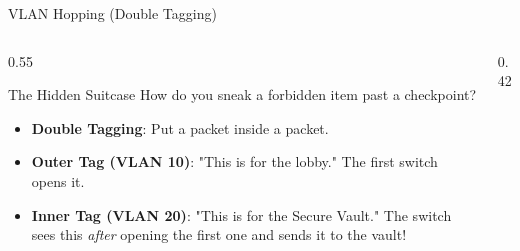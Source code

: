 \documentclass[aspectratio=169]{beamer}  %
\begin{document}
\begin{frame}{VLAN Hopping (Double Tagging)}
    \begin{columns}[T]
        \begin{column}{0.55\textwidth}
            \begin{block}{The Hidden Suitcase}
                \footnotesize
                How do you sneak a forbidden item past a checkpoint?
                \begin{itemize}
                    \item \textbf{Double Tagging}: Put a packet inside a packet.
                    \item \textbf{Outer Tag (VLAN 10)}: "This is for the lobby." The first switch opens it.
                    \item \textbf{Inner Tag (VLAN 20)}: "This is for the Secure Vault." The switch sees this \textit{after} opening the first one and sends it to the vault!
                \end{itemize}
            \end{block}
        \end{column}
        \begin{column}{0.42\textwidth}
            \begin{center}
            \end{center}
        \end{column}
    \end{columns}
\end{frame}
\end{document}
